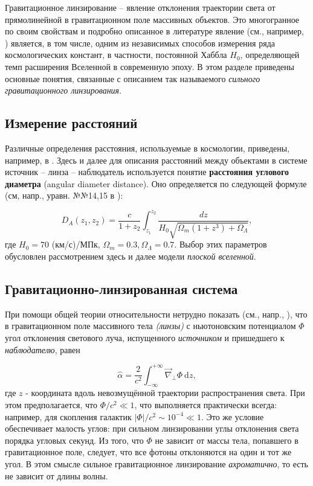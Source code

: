 Гравитационное линзирование -- явление отклонения траектории света от прямолинейной в гравитационном поле массивных объектов.  Это многогранное по своим свойствам и подробно описанное в литературе явление (см., например, \cite{gravlensbook}) является, в том числе, одним из независимых способов измерения ряда космологических констант, в частности, постоянной Хаббла $H_0$, определяющей темп расширения Вселенной в современную эпоху. В этом разделе приведены основные понятия, связанные с описанием так называемого \textit{сильного гравитационного линзирования}. 

\subsection{Измерение расстояний}

Различные определения расстояния, используемые в космологии, приведены, например, в \cite{distance_measures}. Здесь и далее для описания расстояний между объектами в системе источник -- линза -- наблюдатель используется понятие \textbf{расстояния углового диаметра} (angular diameter distance). Оно определяется по следующей формуле (см, напр., уравн. №№14,15 в \cite{distance_measures}):

\begin{equation}\label{ang_dia_dist}
D_{A}\left(z_{1}, z_{2}\right)=\frac{c}{1+z_{2}} \int_{z_{1}}^{z_{2}} \frac{d z}{H_{0} \sqrt{\Omega_{m}\left(1+z^{3}\right)+\Omega_{\Lambda}}},
\end{equation}
где $H_0=70$ (км/с)/МПк, $\Omega_m=0.3, \Omega_\Lambda=0.7$. Выбор этих параметров обусловлен рассмотрением здесь и далее модели \textit{плоской вселенной}.

\subsection{Гравитационно-линзированная система}

При помощи общей теории относительности нетрудно показать (см., напр., \cite{gl_all}), что в гравитационном поле массивного тела \textit{(линзы)} с ньютоновским потенциалом $\Phi$ угол отклонения светового луча, испущенного \textit{источником} и пришедшего к \textit{наблюдателю}, равен

\begin{equation}
\hat{\alpha}=\frac{2}{c^{2}} \int_{-\infty}^{+\infty} \vec{\nabla}_{\perp} \Phi \ \mathrm{d} z,
\end{equation}
где $z$ - координата вдоль невозмущённой траектории распространения света. При этом предполагается, что $\Phi/c^2 \ll 1$, что выполняется практически всегда: например, для скопления галактик  $|\Phi|/c^2 \sim 10^{-4} \ll 1$. Это же условие обеспечивает малость углов: при сильном линзировании углы отклонения света порядка угловых секунд. Из того, что $\Phi$ не зависит от массы тела, попавшего в гравитационное поле, следует, что все фотоны отклоняются на один и тот же угол. В этом смысле сильное гравитационное линзирование \textit{ахроматично}, то есть не зависит от длины волны. 

